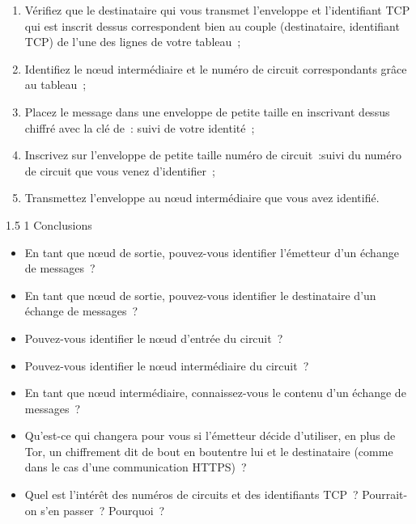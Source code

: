 \documentclass[a4paper,twoside,french]{article}
\makeatletter
\renewcommand\section{\@startsection
  {section}{1}{1cm}%
  {1.5\baselineskip}%
  {1\baselineskip}%
  {\normalfont\Large\bfseries}}%
\makeatother
\begin{document}
  \begin{enumerate}
  \item Vérifiez que le destinataire qui vous transmet l'enveloppe et
    l'identifiant TCP qui est inscrit dessus correspondent bien au couple
    (destinataire, identifiant TCP) de l'une des lignes de votre
    tableau~;
  \item Identifiez le n\oe ud intermédiaire et le numéro de circuit
    correspondants grâce au tableau~;
  \item Placez le message dans une enveloppe de petite taille en
    inscrivant dessus \og chiffré avec la clé de~: \fg suivi de votre
    identité~;
  \item Inscrivez sur l'enveloppe de petite taille \og numéro de
    circuit~:\fg suivi du numéro de circuit que vous venez
    d'identifier~;
  \item Transmettez l'enveloppe au n\oe ud intermédiaire que vous avez
    identifié.
  \end{enumerate}

  \section{Conclusions}

  \begin{itemize}
  \item En tant que n\oe ud de sortie, pouvez-vous identifier
    l'émetteur d'un échange de messages~?
  \item En tant que n\oe ud de sortie, pouvez-vous identifier
    le destinataire d'un échange de messages~?
  \item Pouvez-vous identifier le n\oe ud d'entrée du circuit~?
  \item Pouvez-vous identifier le n\oe ud intermédiaire du circuit~?
  \item En tant que n\oe ud intermédiaire, connaissez-vous le contenu
    d'un échange de messages~?
  \item Qu'est-ce qui changera pour vous si l'émetteur décide
    d'utiliser, en plus de Tor, un chiffrement dit \og de bout en
    bout\fg entre lui et le destinataire (comme dans le cas d'une
    communication HTTPS)~?
  \item Quel est l'intérêt des numéros de circuits et des identifiants
    TCP~? Pourrait-on s'en passer~? Pourquoi~?
  \end{itemize}

  
		
\end{document}
